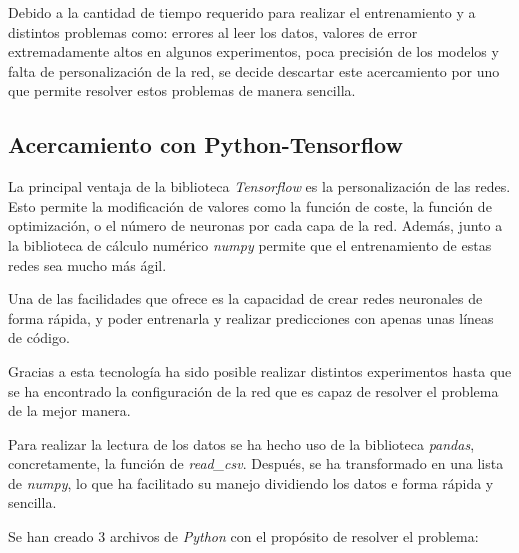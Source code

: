 \documentclass[12pt,a4paper, xcolor=table]{article}
\begin{document}
      \vspace{1mm}

      Debido a la cantidad de tiempo requerido para realizar el entrenamiento y a distintos problemas como: errores al leer los datos, valores de error extremadamente altos en algunos experimentos, poca precisión de los modelos y falta de personalización de la red, se decide descartar este acercamiento por uno que permite resolver estos problemas de manera sencilla.




    \subsection{Acercamiento con Python-Tensorflow}

    La principal ventaja de la biblioteca \textit{Tensorflow} es la personalización de las redes. Esto permite la modificación de valores como la función de coste, la función de optimización, o el número de neuronas por cada capa de la red. Además, junto a la biblioteca de cálculo numérico \textit{numpy} permite que el entrenamiento de estas redes sea mucho más ágil.

    \vspace{3mm}

    Una de las facilidades que ofrece es la capacidad de crear redes neuronales de forma rápida, y poder entrenarla y realizar predicciones con apenas unas líneas de código.

    \vspace{2mm}

    Gracias a esta tecnología ha sido posible realizar distintos experimentos hasta que se ha encontrado la configuración de la red que es capaz de resolver el problema de la mejor manera.

    \vspace{3mm}

    Para realizar la lectura de los datos se ha hecho uso de la biblioteca \textit{pandas}, concretamente, la función de \textit{read\_csv}. Después, se ha transformado en una lista de \textit{numpy}, lo que ha facilitado su manejo dividiendo los datos e forma rápida y sencilla.

    \vspace{4mm}

    Se han creado 3 archivos de \textit{Python} con el propósito de resolver el problema:
\end{document}
